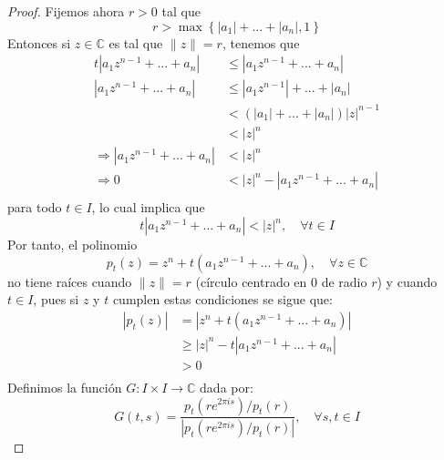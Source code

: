 \documentclass{article}
\newcounter{it}
\theoremstyle{largebreak}
\newcommand\abs[1]{\ensuremath{\left|#1\right|}}
\newcommand\cf[3]{\ensuremath{#1:#2\rightarrow#3}}
\begin{document}
\begin{proof}
        Fijemos ahora $r>0$ tal que
        \begin{equation*}
            r>\max\left\{\abs{a_1}+...+\abs{a_n},1\right\}
        \end{equation*}
        Entonces si $z\in\mathbb{C}$ es tal que $\|z\|=r$, tenemos que
        \begin{equation*}
            \begin{split}
                t\abs{a_1z^{ n-1}+...+a_n}&\leq\abs{a_1z^{ n-1}+...+a_n}\\
                \abs{a_1z^{ n-1}+...+a_n}&\leq\abs{a_1z^{ n-1}}+...+\abs{a_n}\\
                &<(\abs{a_1}+...+\abs{a_n})\abs{z}^{n-1}\\
                &<\abs{z}^n\\
                \Rightarrow \abs{a_1z^{ n-1}+...+a_n}&<\abs{z}^n\\
                \Rightarrow 0 &< \abs{z}^n-\abs{a_1z^{ n-1}+...+a_n}\\
            \end{split}
        \end{equation*}
        para todo $t\in I$, lo cual implica que
        \begin{equation*}
            t\abs{a_1z^{ n-1}+...+a_n}<\abs{z}^n,\quad\forall t\in I
        \end{equation*}
        Por tanto, el polinomio
        \begin{equation*}
            p_t(z)=z^n+t\left(a_1z^{ n-1}+...+a_n \right),\quad\forall z\in\mathbb{C}
        \end{equation*}
        no tiene raíces cuando $\|z\|=r$ (círculo centrado en 0 de radio $r$) y cuando $t\in I$, pues si $z$ y $t$ cumplen estas condiciones se sigue que:
        \begin{equation*}
            \begin{split}
                \abs{p_t(z)}&=\abs{z^n+t\left(a_1z^{ n-1}+...+a_n \right)}\\
                &\geq\abs{z}^n-t\abs{a_1z^{ n-1}+...+a_n}\\
                &>0\\
            \end{split}
        \end{equation*}
        Definimos la función $\cf{G}{I\times I}{\mathbb{C}}$ dada por:
        \begin{equation*}
            G(t,s)=\frac{p_t(re^{ 2\pi is})/p_t(r)}{\abs{p_t(re^{ 2\pi is})/p_t(r)}},\quad\forall s,t\in I

\end{equation*}
\end{proof}
\end{document}
